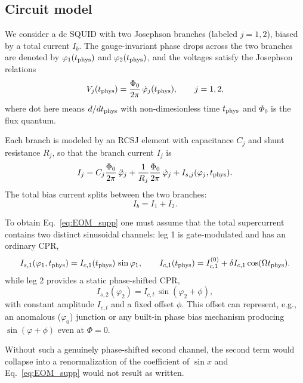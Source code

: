 \documentclass[prl,twocolumn,superscriptaddress,showpacs,nofootinbib]{revtex4-2}
\begin{document}
\subsection{Circuit model}
We consider a dc SQUID with two Josephson branches (labeled $j=1,2$), biased by a total current $I_b$. The gauge-invariant phase drops across the two branches are denoted by $\varphi_1(t_{\rm phys})$ and $\varphi_2(t_{\rm phys})$, and the voltages satisfy the Josephson relations
\begin{equation}
V_j(t_{\rm phys})=\frac{\Phi_0}{2\pi}\,\dot\varphi_j(t_{\rm phys}),
\qquad j=1,2,
\label{eq:JJ_voltage}
\end{equation}
where dot here means $d/dt_{\rm phys}$ with non-dimesionless time $t_{\rm phys}$ and $\Phi_0$ is the flux quantum.

Each branch is modeled by an RCSJ element with capacitance $C_j$ and shunt
resistance $R_j$, so that the branch current $I_j$ is
\begin{equation}
I_j
= C_j\frac{\Phi_0}{2\pi}\,\ddot\varphi_j
+ \frac{1}{R_j}\frac{\Phi_0}{2\pi}\,\dot\varphi_j
+ I_{s,j}(\varphi_j,t_{\rm phys}).
\label{eq:RCSJ_each}
\end{equation}
The total bias current splits between the two branches:
\begin{equation}
I_b = I_1+I_2.
\label{eq:Ib_split}
\end{equation}

To obtain Eq.~\eqref{eq:EOM_supp} one must assume that the total supercurrent contains two distinct sinusoidal channels: leg 1 is gate-modulated and has an ordinary CPR,
\begin{equation}
I_{s,1}(\varphi_1,t_{\rm phys})
= I_{c,1}(t_{\rm phys})\,\sin\varphi_1,
\qquad
I_{c,1}(t_{\rm phys})
= I_{c,1}^{(0)} + \delta I_{c,1}\cos(\Omega t_{\rm phys}).
\label{eq:gate_mod_Ic}
\end{equation}
while leg 2 provides a static phase-shifted CPR,
\begin{equation}
I_{s,2}(\varphi_2)
= I_{c,t}\,\sin(\varphi_2+\phi),
\label{eq:phi_shift_CPR}
\end{equation}
with constant amplitude $I_{c,t}$ and a fixed offset $\phi$. This offset can represent, e.g., an anomalous ($\varphi_0$) junction or any
built-in phase bias mechanism producing $\sin(\varphi+\phi)$ even at $\Phi=0$.

Without such a genuinely phase-shifted second channel, the second term would collapse into a renormalization of the coefficient of $\sin x$ and Eq.~\eqref{eq:EOM_supp} would not result as written.
\end{document}
